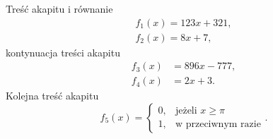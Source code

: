 Treść akapitu i równanie                 %
\begin{gather}                           %
f_{1}(x) = 123 x + 321 \label{eq:2}, \\  %
f_{2}(x) = 8 x + 7     \label{eq:3},     %
\end{gather}                             %
kontynuacja treści akapitu               %
\begin{align}                            %
f_{3}(x) &= 896 x - 777 \label{eq:4}, \\ %
f_{4}(x) &= 2 x + 3     \label{eq:5}.    %
\end{align}                              %
Kolejna treść akapitu                    %
\begin{equation}                         %
f_{5}(x) =                               %
\begin{cases}                            %
0, & \text{jeżeli $x \ge \pi$}  \\       %
1, & \text{w przeciwnym razie}           %
\end{cases}                              %
\label{eq:6}.                            %
\end{equation}                           %
